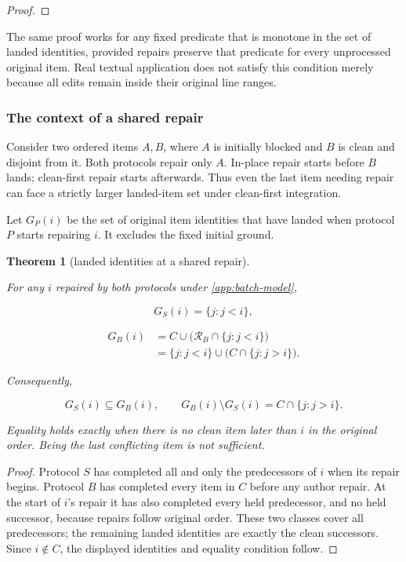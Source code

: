 \documentclass[pdflatex,sn-mathphys-ay]{sn-jnl}
\theoremstyle{thmstyleone}
\newtheorem{theorem}{Theorem}[section]
\theoremstyle{thmstylethree}
\begin{document}
\begin{appendices}
\begin{proof}
\end{proof}

The same proof works for any fixed predicate that is monotone in the set of landed identities, provided repairs preserve that predicate for every unprocessed original item. Real textual application does not satisfy this condition merely because all edits remain inside their original line ranges.

\subsubsection{The context of a shared repair}\label{app:shared-repair-context}

Consider two ordered items \(A,B\), where \(A\) is initially blocked and \(B\) is clean and disjoint from it. Both protocols repair only \(A\). In-place repair starts before \(B\) lands; clean-first repair starts afterwards. Thus even the last item needing repair can face a strictly larger landed-item set under clean-first integration.

Let \(G_P(i)\) be the set of original item identities that have landed when protocol \(P\) starts repairing \(i\). It excludes the fixed initial ground.

\begin{theorem}[landed identities at a shared repair]\label{thm:landed-identities}

For any \(i\) repaired by both protocols under \ref{app:batch-model},

\[
G_S(i)=\{j:j<i\},
\]

\[
\begin{aligned}
G_B(i)
&=C\cup\bigl(\mathcal R_B\cap\{j:j<i\}\bigr)\\
&=\{j:j<i\}\cup\bigl(C\cap\{j:j>i\}\bigr).
\end{aligned}
\]

Consequently,

\[
G_S(i)\subseteq G_B(i),
\qquad
G_B(i)\setminus G_S(i)=C\cap\{j:j>i\}.
\]

Equality holds exactly when there is no clean item later than \(i\) in the original order. Being the last conflicting item is not sufficient.

\end{theorem}
\begin{proof}

Protocol \(S\) has completed all and only the predecessors of \(i\) when its repair begins. Protocol \(B\) has completed every item in \(C\) before any author repair. At the start of \(i\)'s repair it has also completed every held predecessor, and no held successor, because repairs follow original order. These two classes cover all predecessors; the remaining landed identities are exactly the clean successors. Since \(i\notin C\), the displayed identities and equality condition follow.


\end{proof}
\end{appendices}
\end{document}
